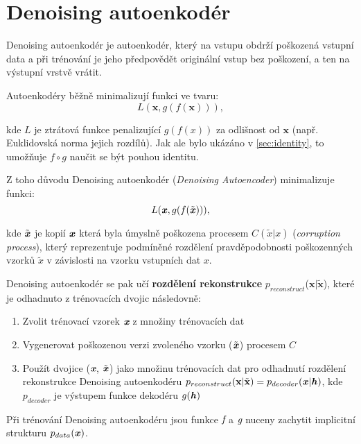 \section{Denoising autoenkodér}
\label{sec:denoising_autoencoder}
Denoising autoenkodér je autoenkodér, který na vstupu obdrží poškozená vstupní data
a při trénování je jeho předpovědět originální vstup bez poškození, a ten na výstupní vrstvě vrátit.

Autoenkodéry běžně minimalizují funkci ve tvaru:
\begin{equation}
    L(\mathbf{x}, g(f(\mathbf{x}))),
\end{equation}

kde $L$ je ztrátová funkce penalizující $g(f(x))$ za odlišnost od $\mathbf{x}$ (např. Euklidovská norma jejich rozdílů).
Jak ale bylo ukázáno v \autoref{sec:identity}, to umožňuje $f \circ g$ naučit se být pouhou identitu.


Z toho důvodu Denoising autoenkodér (\emph{Denoising Autoencoder}) minimalizuje funkci:
\begin{equation}
    L(\textbf{\emph{x}}, g(f(\tilde{\textbf{\emph{x}}}))),
\end{equation}

kde $\tilde{\textbf{\emph{x}}}$ je kopií $\textbf{\emph{x}}$ která byla úmyslně poškozena procesem $C(\tilde{x} | x)$ (\emph{corruption process}),
který reprezentuje podmíněné rozdělení pravděpodobnosti poškozenných vzorků $\tilde{x}$ v závislosti na vzorku vstupních dat $x$.

Denoising autoenkodér se pak učí \textbf{rozdělení rekonstrukce} $p_{reconstruct}$($\mathbf{x}|\mathbf{\tilde{x}}$),
které je odhadnuto z trénovacích dvojic následovně:

\begin{enumerate}
    \item Zvolit trénovací vzorek $\emph{\textbf{x}}$ z množiny trénovacích dat
    \item Vygenerovat poškozenou verzi zvoleného vzorku ($\tilde{\textbf{\emph{x}}}$) procesem $C$
    \item Použít dvojice ($\emph{\textbf{x}}$, $\tilde{\textbf{\emph{x}}}$) jako množinu trénovacích dat pro odhadnutí rozdělení rekonstrukce Denoising autoenkodéru $p_{reconstruct}(\textbf{x} | \tilde{\textbf{x}}) = p_{decoder}(\textbf{\emph{x}}|\textbf{\emph{h}})$, kde $p_{decoder}$ je výstupem funkce dekodéru $g(\textbf{\emph{h}})$
\end{enumerate}

Při trénování Denoising autoenkodéru jsou funkce $\emph{f}$ a $\emph{g}$ nuceny zachytit implicitní strukturu $p_{data}(\textbf{\emph{x}})$.

